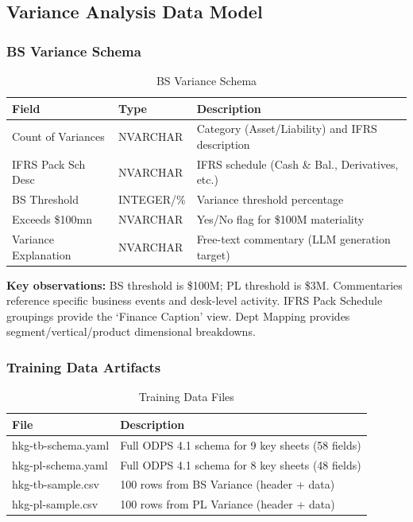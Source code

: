 \documentclass[11pt,a4paper]{article}
\begin{document}
\subsection{Variance Analysis Data Model}

\subsubsection{BS Variance Schema}

\begin{table}[h]
\centering
\caption{BS Variance Schema}
\begin{tabular}{@{}L{4cm}C{2.5cm}L{7.5cm}@{}}
\toprule
\textbf{Field} & \textbf{Type} & \textbf{Description} \\
\midrule
Count of Variances & NVARCHAR & Category (Asset/Liability) and IFRS description \\
IFRS Pack Sch Desc & NVARCHAR & IFRS schedule (Cash \& Bal., Derivatives, etc.) \\
BS Threshold & INTEGER/\% & Variance threshold percentage \\
Exceeds \$100mn & NVARCHAR & Yes/No flag for \$100M materiality \\
Variance Explanation & NVARCHAR & Free-text commentary (LLM generation target) \\
\bottomrule
\end{tabular}
\end{table}

\textbf{Key observations:} BS threshold is \$100M; PL threshold is \$3M. 
Commentaries reference specific business events and desk-level activity. 
IFRS Pack Schedule groupings provide the `Finance Caption' view. 
Dept Mapping provides segment/vertical/product dimensional breakdowns.

\subsubsection{Training Data Artifacts}

\begin{table}[h]
\centering
\caption{Training Data Files}
\begin{tabular}{@{}L{4.5cm}L{9.5cm}@{}}
\toprule
\textbf{File} & \textbf{Description} \\
\midrule
hkg-tb-schema.yaml & Full ODPS 4.1 schema for 9 key sheets (58 fields) \\
hkg-pl-schema.yaml & Full ODPS 4.1 schema for 8 key sheets (48 fields) \\
hkg-tb-sample.csv & 100 rows from BS Variance (header + data) \\
hkg-pl-sample.csv & 100 rows from PL Variance (header + data) \\
\bottomrule
\end{tabular}
\end{table}
\end{document}
